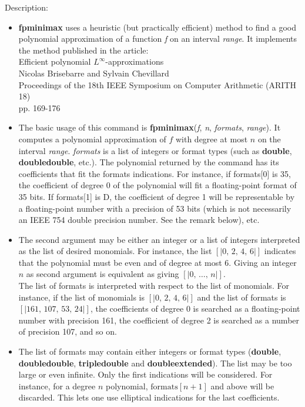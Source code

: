 \noindent Description: \begin{itemize}

\item \textbf{fpminimax} uses a heuristic (but practically efficient) method to find a good
   polynomial approximation of a function \emph{f} on an interval \emph{range}. It 
   implements the method published in the article:\\
   Efficient polynomial $L^\infty$-approximations\\ 
   Nicolas Brisebarre and Sylvain Chevillard\\
   Proceedings of the 18th IEEE Symposium on Computer Arithmetic (ARITH 18)\\
   pp. 169-176

\item The basic usage of this command is \textbf{fpminimax}(\emph{f}, \emph{n}, \emph{formats}, \emph{range}).
   It computes a polynomial approximation of $f$ with degree at most $n$
   on the interval \emph{range}. \emph{formats} is a list of integers or format types 
   (such as \textbf{double}, \textbf{doubledouble}, etc.). The polynomial returned by the
   command has its coefficients that fit the formats indications. For 
   instance, if formats[0] is 35, the coefficient of degree 0 of the 
   polynomial will fit a floating-point format of 35 bits. If formats[1] 
   is D, the coefficient of degree 1 will be representable by a floating-point
   number with a precision of 53 bits (which is not necessarily an IEEE 754 double
   precision number. See the remark below), etc.

\item The second argument may be either an integer or a list of integers
   interpreted as the list of desired monomials. For instance, the list
   $[|0,\,2,\,4,\,6|]$ indicates that the polynomial must be even and of
   degree at most 6. Giving an integer $n$ as second argument is equivalent
   as giving $[|0,\,\dots,\,n|]$.\\
   The list of formats is interpreted with respect to the list of monomials. For
   instance, if the list of monomials is $[|0,\,2,\,4,\,6|]$ and the list
   of formats is $[|161,\,107,\,53,\,24|]$, the coefficients of degree 0 is 
   searched as a floating-point number with precision 161, the coefficient of 
   degree 2 is searched as a number of precision 107, and so on.

\item The list of formats may contain either integers or format types (\textbf{double},
   \textbf{doubledouble}, \textbf{tripledouble} and \textbf{doubleextended}). The list may be too large
   or even infinite. Only the first indications will be considered. For 
   instance, for a degree $n$ polynomial, $\mathrm{formats}[n+1]$ and above will
   be discarded. This lets one use elliptical indications for the last
   coefficients.


\end{itemize}
